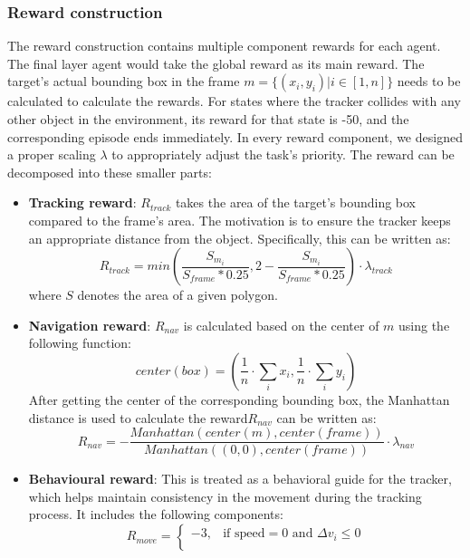 \documentclass[sigconf]{aamas}
\begin{document}
\subsubsection{Reward construction}
The reward construction contains multiple component rewards for each agent. The final layer agent would take the global reward as its main reward. The target's actual bounding box in the frame \(m = \{(x_i, y_i)|i \in [1, n]\}\) needs to be calculated to calculate the rewards. For states where the tracker collides with any other object in the environment, its reward for that state is -50, and the corresponding episode ends immediately. In every reward component, we designed a proper scaling \(\lambda\) to appropriately adjust the task's priority. The reward can be decomposed into these smaller parts:
\begin{itemize}
    \item \textbf{Tracking reward}: \(R_{track}\) takes the area of the target's bounding box compared to the frame's area. The motivation is to ensure the tracker keeps an appropriate distance from the object. Specifically, this can be written as: 
    \begin{equation}
    R_{track} = min(\dfrac{S_{m_i}}{S_{frame} * 0.25}, 2 - \dfrac{S_{m_i}}{S_{frame} * 0.25}) \cdot \lambda_{track}
    \end{equation}
    where \(S\) denotes the area of a given polygon.
    \item \textbf{Navigation reward}: \(R_{nav}\) is calculated based on the center of \(m\) using the following function:
    \begin{equation}
    center(box) = (\dfrac{1}{n} \cdot \sum_{i}x_i, \dfrac{1}{n} \cdot \sum_{i}y_i)
    \end{equation}
    After getting the center of the corresponding bounding box, the Manhattan distance is used to calculate the reward\(R_{nav}\) can be written as:
    \begin{equation}
    R_{nav} = -\dfrac{Manhattan(center(m), center(frame))}{Manhattan((0, 0), center(frame))} \cdot \lambda_{nav}
    \end{equation}
    \item \textbf{Behavioural reward}: This is treated as a behavioral guide for the tracker, which helps maintain consistency in the movement during the tracking process. It includes the following components:
    \begin{equation}
    R_{move} = \begin{cases}
  -3, & \text{if } \text{speed} = 0 \text{ and } \Delta v_i \leq 0 \\

\end{cases}
\end{equation}
\end{itemize}
\end{document}
